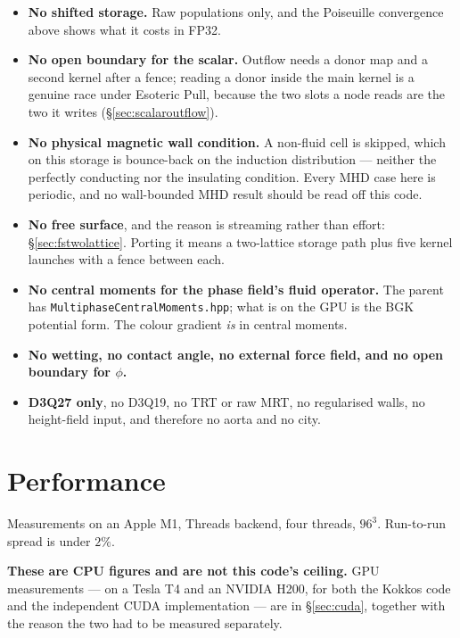 \documentclass[11pt,a4paper]{article}
\newcommand{\code}[1]{\texttt{\small #1}}
\begin{document}
\begin{itemize}[leftmargin=1.4em,itemsep=3pt]
\item \textbf{No shifted storage.} Raw populations only, and the Poiseuille
  convergence above shows what it costs in FP32.
\item \textbf{No open boundary for the scalar.} Outflow needs a donor map and a
  second kernel after a fence; reading a donor inside the main kernel is a genuine
  race under Esoteric Pull, because the two slots a node reads are the two it
  writes (\S\ref{sec:scalaroutflow}).
\item \textbf{No physical magnetic wall condition.} A non-fluid cell is skipped,
  which on this storage is bounce-back on the induction distribution --- neither
  the perfectly conducting nor the insulating condition. Every MHD case here is
  periodic, and no wall-bounded MHD result should be read off this code.
\item \textbf{No free surface}, and the reason is streaming rather than effort:
  \S\ref{sec:fstwolattice}. Porting it means a two-lattice storage path plus
  five kernel launches with a fence between each.
\item \textbf{No central moments for the phase field's fluid operator.} The
  parent has \code{MultiphaseCentralMoments.hpp}; what is on the GPU is the BGK
  potential form. The colour gradient \emph{is} in central moments.
\item \textbf{No wetting, no contact angle, no external force field, and no
  open boundary for $\phi$.}
\item \textbf{D3Q27 only}, no D3Q19, no TRT or raw MRT, no regularised walls, no
  height-field input, and therefore no aorta and no city.
\end{itemize}

\section{Performance}
\label{sec:perf}

Measurements on an Apple M1, Threads backend, four threads, $96^3$. Run-to-run
spread is under $2\%$.

\textbf{These are CPU figures and are not this code's ceiling.} GPU
measurements --- on a Tesla T4 and an NVIDIA H200, for both the Kokkos code and
the independent CUDA implementation --- are in \S\ref{sec:cuda}, together with
the reason the two had to be measured separately.
\end{document}
